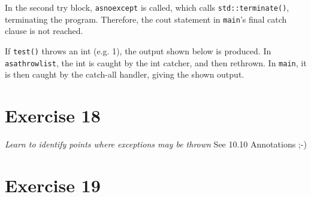 \documentclass[12pt]{article}
\newcommand{\desc}[1]{\textit{#1} \vspace{1em}}
\begin{document}
In the second try block, \texttt{asnoexcept} is called, which calls \texttt{std::terminate()}, terminating the program. Therefore, the cout statement in \texttt{main}'s final catch clause is not reached. 



If \texttt{test()} throws an int (e.g. 1), the output shown below is produced. In \texttt{asathrowlist}, the int is caught by the int catcher, and then rethrown. In \texttt{main}, it is then caught by the catch-all handler, giving the shown output. 





\clearpage
\section*{Exercise 18}
\desc{Learn to identify points where exceptions may be thrown}
See 10.10 Annotations ;-)

\clearpage
\section*{Exercise 19}
\desc{}


\clearpage
\end{document}
